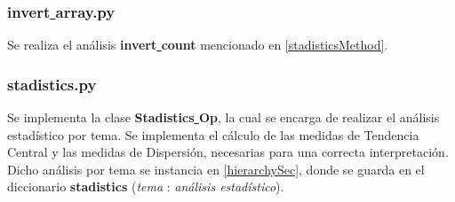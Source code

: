 \documentclass{book}
\begin{document}
			\subsubsection{invert\underline{ }array.py}
				Se realiza el an\'alisis \textbf{invert\underline{ }count} mencionado en \ref{stadisticsMethod}.
			\subsubsection{stadistics.py}
				Se implementa la clase \textbf{Stadistics\underline{ }Op}, la cual se encarga de realizar el an\'alisis estad\'istico por tema. Se implementa el c\'alculo de las medidas de Tendencia Central y las medidas de Dispersi\'on, necesarias para una correcta interpretaci\'on. Dicho an\'alisis por tema se instancia en \ref{hierarchySec}, donde se guarda en el diccionario \textbf{stadistics} (\textit{tema} : \textit{an\'alisis estad\'istico}).
\end{document}
